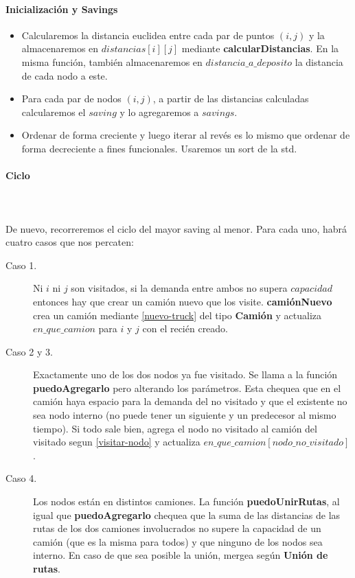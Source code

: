 \paragraph{Inicialización y Savings}

\begin{itemize}
	\item Calcularemos la distancia euclidea entre cada par de puntos $(i,j)$ y la almacenaremos en $distancias[i][j]$ mediante \textbf{calcularDistancias}. En la misma función, también almacenaremos en $distancia\_a\_deposito$ la distancia de cada nodo a este.
	\item Para cada par de nodos $(i,j)$, a partir de las distancias calculadas calcularemos el $saving$ y lo agregaremos a $savings$.  
	\item Ordenar de forma creciente y luego iterar al revés es lo mismo que ordenar de forma decreciente a fines funcionales. Usaremos un sort de la std.
\end{itemize}

\paragraph{Ciclo}\hspace{0pt} \\
\\
De nuevo, recorreremos el ciclo del mayor saving al menor. Para cada uno, habrá cuatro casos que nos percaten:
\begin{description}
	\item[Caso 1.] Ni $i$ ni $j$ son visitados, si la demanda entre ambos no supera $capacidad$ entonces hay que crear un camión nuevo que los visite.  \textbf{camiónNuevo} crea un camión mediante  \ref{nuevo-truck} del tipo \textbf{Camión} y actualiza $en\_que\_camion$ para $i$ y $j$ con el recién creado.
	\item[Caso 2 y 3.] Exactamente uno de los dos nodos ya fue visitado. Se llama a la función \textbf{puedoAgregarlo} pero alterando los parámetros. Esta chequea que en el camión haya espacio para la demanda del no visitado y que el existente no sea nodo interno (no puede tener un siguiente y un predecesor al mismo tiempo). Si todo sale bien, agrega el nodo no visitado al camión del visitado segun \ref{visitar-nodo} y actualiza $en\_que\_camion[nodo\_no\_visitado]$.
	\item[Caso 4.] Los nodos están en distintos camiones. La función \textbf{puedoUnirRutas}, al igual que \textbf{puedoAgregarlo} chequea que la suma de las distancias de las rutas de los dos camiones involucrados no supere la capacidad de un camión (que es la misma para todos) y que ninguno de los nodos sea interno. En caso de que sea posible la unión, mergea según \textbf{Unión de rutas}.
\end{description}

